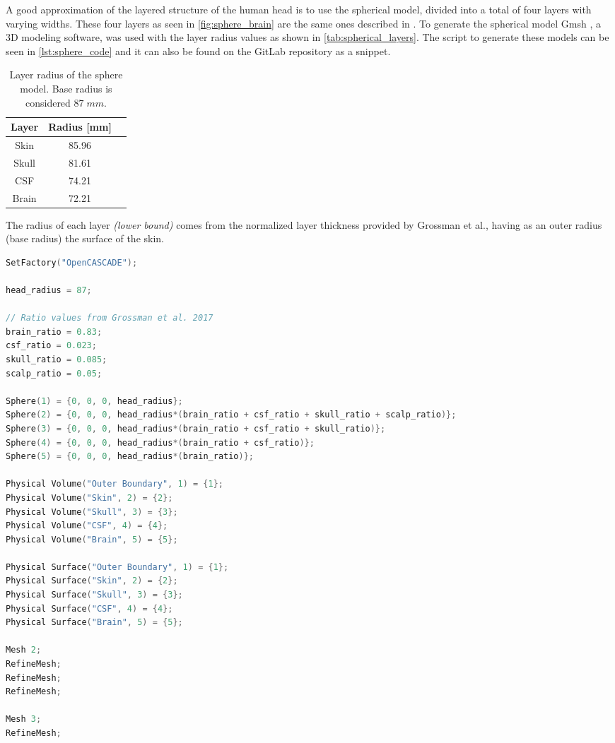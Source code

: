 A good approximation of the layered structure of the human head is to use the spherical model, divided into a total of four layers with varying widths. These four layers as seen in \autoref{fig:sphere_brain} are the same ones described in . To generate the spherical model Gmsh \cite{gmsh}, a 3D modeling software, was used with the layer radius values as shown in \autoref{tab:spherical_layers}. The script to generate these models can be seen in \autoref{lst:sphere_code} and it can also be found on the GitLab repository \cite{thesis_repo} as a snippet.
\begin{table}[!ht]
\begin{minipage}{.62\linewidth}
\centering
\caption{Layer radius of the sphere model. Base radius is considered $87\;\si{mm}$.}
\label{tab:spherical_layers}
\begin{tabular}{|c|c|c|}
\hline
\rowcolor[HTML]{C0C0C0} 
{\color[HTML]{000000} \textbf{Layer}} & {\color[HTML]{000000} \textbf{Radius {[}mm{]}}} \\ \hline
Skin & 85.96 \\ \hline
Skull & 81.61 \\ \hline
CSF & 74.21 \\ \hline
Brain & 72.21 \\ \hline
\end{tabular}
\end{minipage}
\end{table}

\noindent The radius of each layer \textit{(lower bound)} comes from the normalized layer thickness provided by Grossman et al.\cite[Figure S2, J and K]{Grossman2017}, having as an outer radius (base radius) the surface of the skin.

\begin{lstlisting}[language=C,caption={Sphere \gls{CAD} model generation code in \texttt{geo} format},captionpos=b, label=lst:sphere_code]
SetFactory("OpenCASCADE");

head_radius = 87;

// Ratio values from Grossman et al. 2017
brain_ratio = 0.83;
csf_ratio = 0.023;
skull_ratio = 0.085;
scalp_ratio = 0.05;

Sphere(1) = {0, 0, 0, head_radius};
Sphere(2) = {0, 0, 0, head_radius*(brain_ratio + csf_ratio + skull_ratio + scalp_ratio)};
Sphere(3) = {0, 0, 0, head_radius*(brain_ratio + csf_ratio + skull_ratio)};
Sphere(4) = {0, 0, 0, head_radius*(brain_ratio + csf_ratio)};
Sphere(5) = {0, 0, 0, head_radius*(brain_ratio)};

Physical Volume("Outer Boundary", 1) = {1};
Physical Volume("Skin", 2) = {2};
Physical Volume("Skull", 3) = {3};
Physical Volume("CSF", 4) = {4};
Physical Volume("Brain", 5) = {5};

Physical Surface("Outer Boundary", 1) = {1};
Physical Surface("Skin", 2) = {2};
Physical Surface("Skull", 3) = {3};
Physical Surface("CSF", 4) = {4};
Physical Surface("Brain", 5) = {5};

Mesh 2;
RefineMesh;
RefineMesh;
RefineMesh;

Mesh 3;
RefineMesh;
\end{lstlisting}

